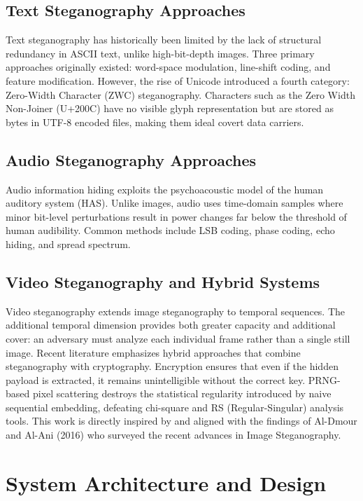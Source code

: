 \documentclass[12pt,a4paper]{report}
\begin{document}
\section{Text Steganography Approaches}
Text steganography has historically been limited by the lack of structural redundancy in ASCII text, unlike high-bit-depth images. Three primary approaches originally existed: word-space modulation, line-shift coding, and feature modification. However, the rise of Unicode introduced a fourth category: Zero-Width Character (ZWC) steganography. Characters such as the Zero Width Non-Joiner (U+200C) have no visible glyph representation but are stored as bytes in UTF-8 encoded files, making them ideal covert data carriers.

\section{Audio Steganography Approaches}
Audio information hiding exploits the psychoacoustic model of the human auditory system (HAS). Unlike images, audio uses time-domain samples where minor bit-level perturbations result in power changes far below the threshold of human audibility. Common methods include LSB coding, phase coding, echo hiding, and spread spectrum.

\section{Video Steganography and Hybrid Systems}
Video steganography extends image steganography to temporal sequences. The additional temporal dimension provides both greater capacity and additional cover: an adversary must analyze each individual frame rather than a single still image. Recent literature emphasizes hybrid approaches that combine steganography with cryptography. Encryption ensures that even if the hidden payload is extracted, it remains unintelligible without the correct key. PRNG-based pixel scattering destroys the statistical regularity introduced by naive sequential embedding, defeating chi-square and RS (Regular-Singular) analysis tools. This work is directly inspired by and aligned with the findings of Al-Dmour and Al-Ani (2016) who surveyed the recent advances in Image Steganography.

\chapter{System Architecture and Design}
\end{document}
